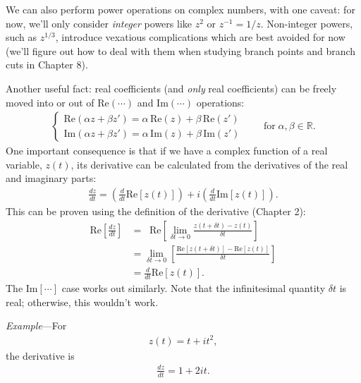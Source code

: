 \documentclass[10pt,a4paper]{article}
\begin{document}
We can also perform power operations on complex numbers, with one
caveat: for now, we'll only consider \textit{integer} powers like
$z^2$ or $z^{-1} = 1/z$.  Non-integer powers, such as $z^{1/3}$,
introduce vexatious complications which are best avoided for now
(we'll figure out how to deal with them when studying branch points
and branch cuts in Chapter 8).

Another useful fact: real coefficients (and \textit{only} real
coefficients) can be freely moved into or out of $\textrm{Re}(\cdots)$
and $\textrm{Im}(\cdots)$ operations:
\begin{align}
  \left\{\begin{array}{l}\mathrm{Re}(\alpha z + \beta z') = \alpha \, \mathrm{Re}(z) + \beta\, \mathrm{Re}(z')\\ \mathrm{Im}(\alpha z + \beta z') = \alpha \, \mathrm{Im}(z) + \beta\, \mathrm{Im}(z')\end{array}\right.\qquad\mathrm{for}\;\alpha, \beta \in \mathbb{R}.
\end{align}
One important consequence is that if we have a complex function of a
real variable, $z(t)$, its derivative can be calculated from the
derivatives of the real and imaginary parts:
\begin{align}
  \frac{dz}{dt} = \left(\frac{d}{dt} \mathrm{Re}\left[z(t)\right] \right) + i \left(\frac{d}{dt} \mathrm{Im}\left[z(t)\right]\right).
\end{align}
This can be proven using the definition of the derivative (Chapter 2):
\begin{align}
  \mathrm{Re}\left[\frac{dz}{dt}\right] &= \;\; \mathrm{Re}\left[\lim_{\delta t \rightarrow 0} \frac{z(t+\delta t) - z(t)}{\delta t}\right] \\
    &= \lim_{\delta t \rightarrow 0} \left[\frac{\mathrm{Re}[z(t+\delta t)] - \mathrm{Re}[z(t)]}{\delta t}\right] \\
    &= \frac{d}{dt} \mathrm{Re}\left[z(t)\right].
\end{align}
The $\mathrm{Im}[\cdots]$ case works out similarly.  Note that the
infinitesimal quantity $\delta t$ is real; otherwise, this wouldn't
work.

\begin{framed}\noindent
  \textit{Example}---For
  \begin{align}
    z(t) = t + it^2,
  \end{align}
  the derivative is
  \begin{align}
    \frac{dz}{dt} = 1 + 2it.
  \end{align}
\end{framed}
\end{document}
